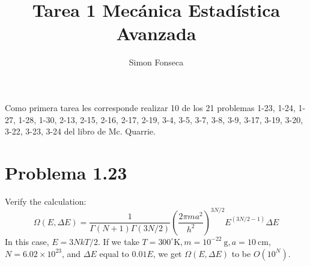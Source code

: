 \documentclass[]{article}
\title{Tarea 1 Mecánica Estadística Avanzada}
\author{Simon Fonseca}
\numberwithin{equation}{section}
\newcommand{\0}{\textcolor{gray}{0}}
\begin{document}
\maketitle

Como primera tarea les corresponde realizar 10 de los 21 problemas 1-23, 1-24, 1-27, 1-28, 1-30, 2-13, 2-15, 2-16, 2-17, 2-19, 3-4, 3-5, 3-7, 3-8, 3-9, 3-17, 3-19, 3-20, 3-22, 3-23, 3-24 del libro de Mc. Quarrie.

\section{Problema 1.23}
Verify the calculation:
\begin{equation}
	\Omega(E, \Delta E)=\frac{1}{\Gamma(N+1) \Gamma(3 N / 2)}\left(\frac{2 \pi m a^2}{h^2}\right)^{3 N / 2} E^{(3 N / 2-1)} \Delta E
\end{equation}
In this case, $E=3 N k T / 2$. If we take $T=300^{\circ} \mathrm{K}, m=10^{-22} \mathrm{~g}, a=10 \mathrm{~cm}$, $N=6.02 \times 10^{23}$, and $\Delta E$ equal to $0.01 E$, we get $\Omega(E, \Delta E)$ to be $O\left(10^N\right)$.
\\
\end{document}
